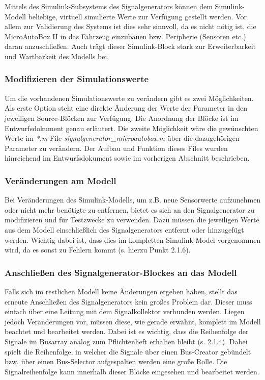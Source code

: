 \documentclass[fontsize = 12pt, paper = a4]{scrreprt}
\begin{document}
Mittels des Simulink-Subsystems des Signalgenerators können dem Simulink-Modell beliebige, virtuell simulierte Werte zur Verfügung gestellt werden. Vor allem zur Validierung des Systems ist dies sehr sinnvoll, da es nicht nötig ist, die MicroAutoBox II in das Fahrzeug einzubauen bzw. Peripherie (Sensoren etc.) daran anzuschließen. Auch trägt dieser Simulink-Block stark zur Erweiterbarkeit und Wartbarkeit des Modells bei.  

\subsubsection{Modifizieren der Simulationswerte}

Um die vorhandenen Simulationswerte zu verändern gibt es zwei Möglichkeiten. 
Als erste Option steht eine direkte Änderung der Werte  der Parameter in den jeweiligen Source-Blöcken zur Verfügung. 
Die Anordnung der Blöcke ist im Entwurfsdokument genau erläutert. 
Die zweite Möglichkeit wäre die gewünschten Werte im \textit{*.m}-File \textit{signalgenerator\_microautobox.m} über die dazugehörigen Parameter zu verändern. 
Der Aufbau und Funktion dieses Files wurden hinreichend im Entwurfsdokument sowie im vorherigen Abschnitt beschrieben.


\subsubsection{Veränderungen am Modell} 

Bei Veränderungen des Simulink-Modells, um z.B. neue Sensorwerte aufzunehmen oder nicht mehr benötigte zu entfernen, bietet es sich an den Signalgenerator zu modifizieren und für Testzwecke zu verwenden. Dazu müssen die jeweiligen Werte aus dem Modell einschließlich des Signalgenerators entfernt oder hinzugefügt werden. Wichtig dabei ist, dass dies im kompletten Simulink-Model vorgenommen wird, da es sonst zu Fehlern kommt (s. hierzu Punkt 2.1.6). 


\subsubsection{Anschließen des Signalgenerator-Blockes an das Modell}

Falls sich im restlichen Modell keine Änderungen ergeben haben, stellt das erneute Anschließen des Signalgenerators kein großes Problem dar. 
Dieser muss einfach über eine Leitung mit dem Signalkollektor verbunden werden.  
Liegen jedoch Veränderungen vor, müssen diese, wie gerade erwähnt, komplett im Modell beachtet und bearbeitet werden. 
Dabei ist es wichtig, dass die Reihenfolge der Signale im Busarray analog zum Pflichtenheft erhalten bleibt (s. 2.1.4). 
Dabei spielt die Reihenfolge, in welcher die Signale über einen Bus-Creator gebündelt bzw. über einen Bus-Selector aufgespalten werden eine große Rolle. 
Die Signalreihenfolge kann innerhalb dieser Blöcke eingesehen und bearbeitet werden. 
\end{document}
